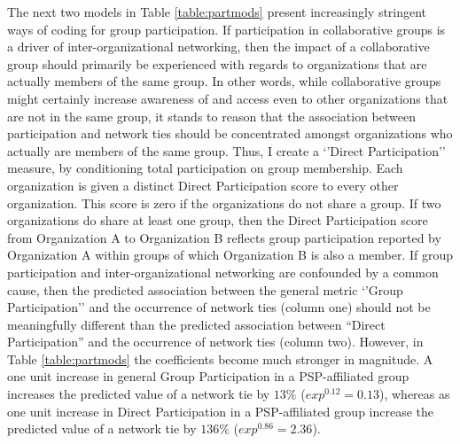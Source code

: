 \documentclass[12pt,a4paper,titlepage]{article}
\begin{document}
%
\singlespacing

\doublespacing

The next two models in Table \ref{table:partmods} present increasingly stringent ways of coding for group participation. If participation in collaborative groups is a driver of inter-organizational networking, then the impact of a collaborative group should primarily be experienced with regards to organizations that are actually members of the same group. In other words, while collaborative groups might certainly increase awareness of and access even to other organizations that are not in the same group, it stands to reason that the association between participation and network ties should be concentrated amongst organizations who actually are members of the same group. Thus, I create a ‘’Direct Participation’’ measure, by conditioning total participation on group membership. Each organization is given a distinct Direct Participation score to every other organization. This score is zero if the organizations do not share a group. If two organizations do share at least one group, then the Direct Participation score from Organization A to Organization B reflects group participation reported by Organization A within groups of which Organization B is also a member. If group participation and inter-organizational networking are confounded by a common cause, then the predicted association between the general metric `'Group Participation'' and the occurrence of network ties (column one) should not be meaningfully different than the predicted association between “Direct Participation” and the occurrence of network ties (column two). However, in Table \ref{table:partmods} the coefficients become much stronger in magnitude. A one unit increase in general Group Participation in a PSP-affiliated group increases the predicted value of a network tie by $13\%$ ($exp^{0.12} = 0.13$), whereas as one unit increase in Direct Participation in a PSP-affiliated group increase the predicted value of a network tie by $136\%$ ($exp^{0.86} = 2.36$).
\end{document}
